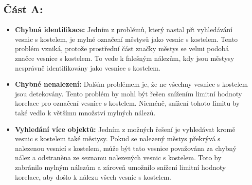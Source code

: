 \subsection*{Část A:}
\begin{itemize}
    \item \textbf{Chybná identifikace:} Jedním z problémů, který nastal při vyhledávání vesnic s kostelem, je mylné označení městysů jako vesnic s kostelem. Tento problém vzniká, protože prostřední část značky městys se velmi podobá značce vesnice s kostelem. To vede k falešným nálezům, kdy jsou městysy nesprávně identifikovány jako vesnice s kostelem.
    \item \textbf{Chybné nenalezení:} Dalším problémem je, že ne všechny vesnice s kostelem jsou detekovány. Tento problém by mohl být řešen snížením limitní hodnoty korelace pro označení vesnice s kostelem. Nicméně, snížení tohoto limitu by také vedlo k většímu množství mylných nálezů.
    \item \textbf{Vyhledání více objektů:} Jedním z možných řešení je vyhledávat kromě vesnic s kostelem také městysy. Pokud se nalezený městys překrývá s nalezenou vesnicí s kostelem, může být tato vesnice považována za chybný nález a odstraněna ze seznamu nalezených vesnic s kostelem. Toto by zabránilo mylným nálezům a zároveň umožnilo snížení limitní hodnoty korelace, aby došlo k nálezu všech vesnic s kostelem.
\end{itemize}

